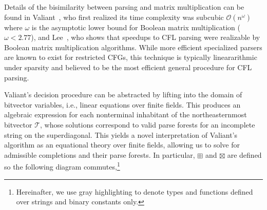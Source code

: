 \documentclass[sigplan,review,anonymous,acmsmall]{acmart}\settopmatter{printfolios=false,printccs=false,printacmref=false}
\begin{document}
Details of the bisimilarity between parsing and matrix multiplication can be found in Valiant~\cite{valiant1975general}, who first realized its time complexity was subcubic $\mathcal{O}(n^\omega)$ where $\omega$ is the asymptotic lower bound for Boolean matrix multiplication ($\omega < 2.77$), and Lee~\cite{lee2002fast}, who shows that speedups to CFL parsing were realizable by Boolean matrix multiplication algorithms. While more efficient specialized parsers are known to exist for restricted CFGs, this technique is typically lineararithmic under sparsity and believed to be the most efficient general procedure for CFL parsing.

Valiant's decision procedure can be abstracted by lifting into the domain of bitvector variables, i.e., linear equations over finite fields. This produces an algebraic expression for each nonterminal inhabitant of the northeasternmost bitvector $\mathcal{T}$, whose solutions correspond to valid parse forests for an incomplete string on the superdiagonal. This yields a novel interpretation of Valiant's algorithm as an equational theory over finite fields, allowing us to solve for admissible completions and their parse forests. In particular, $\boxplus$ and $\boxtimes$ are defined so the following diagram commutes,\footnote{Hereinafter, we use gray highlighting to denote types and functions defined over strings and binary constants only.}
\end{document}
